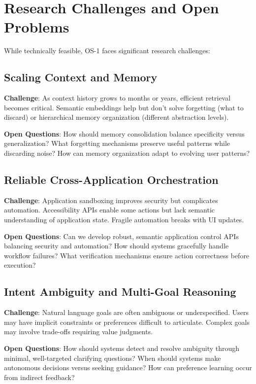 \documentclass[conference]{IEEEtran}
\begin{document}
\section{Research Challenges and Open Problems}

While technically feasible, OS-1 faces significant research challenges:

\subsection{Scaling Context and Memory}

\textbf{Challenge}: As context history grows to months or years, efficient retrieval becomes critical. Semantic embeddings help but don't solve forgetting (what to discard) or hierarchical memory organization (different abstraction levels).

\textbf{Open Questions}: How should memory consolidation balance specificity versus generalization? What forgetting mechanisms preserve useful patterns while discarding noise? How can memory organization adapt to evolving user patterns?

\subsection{Reliable Cross-Application Orchestration}

\textbf{Challenge}: Application sandboxing improves security but complicates automation. Accessibility APIs enable some actions but lack semantic understanding of application state. Fragile automation breaks with UI updates.

\textbf{Open Questions}: Can we develop robust, semantic application control APIs balancing security and automation? How should systems gracefully handle workflow failures? What verification mechanisms ensure action correctness before execution?

\subsection{Intent Ambiguity and Multi-Goal Reasoning}

\textbf{Challenge}: Natural language goals are often ambiguous or underspecified. Users may have implicit constraints or preferences difficult to articulate. Complex goals may involve trade-offs requiring value judgments.

\textbf{Open Questions}: How should systems detect and resolve ambiguity through minimal, well-targeted clarifying questions? When should systems make autonomous decisions versus seeking guidance? How can preference learning occur from indirect feedback?
\end{document}
